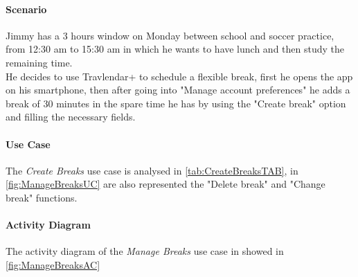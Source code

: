\paragraph*{Scenario\\}
Jimmy has a 3 hours window on Monday between school and soccer practice, from 12:30 am to 15:30 am in which he wants to have lunch and then study the remaining time.\\
He decides to use Travlendar+ to schedule a flexible break, first he opens the app on his smartphone, then after going into "Manage account preferences" he adds a break of 30 minutes in the spare time he has by using the "Create break" option and filling the necessary fields.
\paragraph*{Use Case\\}
The \emph{Create Breaks} use case is analysed in \autoref{tab:CreateBreaksTAB}, in \autoref{fig:ManageBreaksUC} are also represented the "Delete break" and "Change break" functions.
\paragraph*{Activity Diagram\\}
The activity diagram of the \emph{Manage Breaks} use case in showed in \autoref{fig:ManageBreaksAC}
